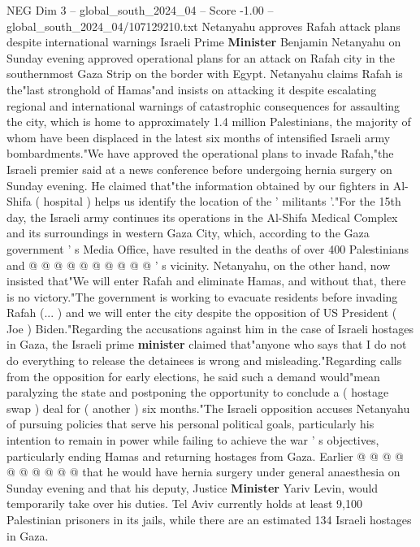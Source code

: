 \begin{textsample}{NEG Dim 3 – global\_south\_2024\_04 – Score -1.00 – global\_south\_2024\_04/107129210.txt}  \label{ex:f3_neg_250}
Netanyahu approves Rafah attack plans despite international warnings Israeli Prime \textbf{Minister} Benjamin Netanyahu on Sunday evening approved operational plans for an attack on Rafah city in the southernmost Gaza Strip on the border with Egypt.
Netanyahu claims Rafah is the"last stronghold of Hamas"and insists on attacking it despite escalating regional and international warnings of catastrophic consequences for assaulting the city, which is home to approximately 1.4 million Palestinians, the majority of whom have been displaced in the latest six months of intensified Israeli army bombardments."We have approved the operational plans to invade Rafah,"the Israeli premier said at a news conference before undergoing hernia surgery on Sunday evening.
He claimed that"the information obtained by our fighters in Al-Shifa ( hospital ) helps us identify the location of the ' militants '."For the 15th day, the Israeli army continues its operations in the Al-Shifa Medical Complex and its surroundings in western Gaza City, which, according to the Gaza government ' s Media Office, have resulted in the deaths of over 400 Palestinians and @ @ @ @ @ @ @ @ @ @ ' s vicinity.
Netanyahu, on the other hand, now insisted that"We will enter Rafah and eliminate Hamas, and without that, there is no victory."The government is working to evacuate residents before invading Rafah (... ) and we will enter the city despite the opposition of US President ( Joe ) Biden."Regarding the accusations against him in the case of Israeli hostages in Gaza, the Israeli prime \textbf{minister} claimed that"anyone who says that I do not do everything to release the detainees is wrong and misleading."Regarding calls from the opposition for early elections, he said such a demand would"mean paralyzing the state and postponing the opportunity to conclude a ( hostage swap ) deal for ( another ) six months."The Israeli opposition accuses Netanyahu of pursuing policies that serve his personal political goals, particularly his intention to remain in power while failing to achieve the war ' s objectives, particularly ending Hamas and returning hostages from Gaza.
Earlier @ @ @ @ @ @ @ @ @ @ that he would have hernia surgery under general anaesthesia on Sunday evening and that his deputy, Justice \textbf{Minister} Yariv Levin, would temporarily take over his duties.
Tel Aviv currently holds at least 9,100 Palestinian prisoners in its jails, while there are an estimated 134 Israeli hostages in Gaza.

\end{textsample}
